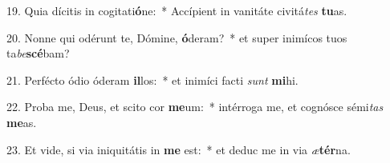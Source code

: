 19. Quia dícitis in cogitati\textbf{ó}ne:~*  Accípient in vanitáte civitá\textit{tes} \textbf{tu}as.\

20. Nonne qui odérunt te, Dómine, \textbf{ó}deram?~*  et super inimícos tuos ta\textit{be}\textbf{scé}bam?\

21. Perfécto ódio óderam \textbf{il}los:~*  et inimíci facti \textit{sunt} \textbf{mi}hi.\

22. Proba me, Deus, et scito cor \textbf{me}um:~*  intérroga me, et cognósce sémi\textit{tas} \textbf{me}as.\

23. Et vide, si via iniquitátis in \textbf{me} est:~*  et deduc me in via \textit{æ}\textbf{tér}na.\

